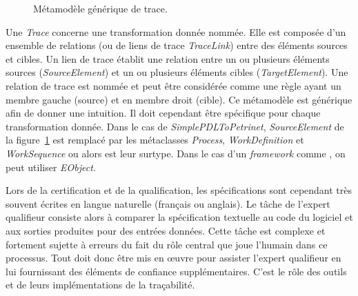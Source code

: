 \begin{figure}[h]
  \begin{center}
    
    \caption{Métamodèle générique de trace.}
    \label{fig:linkmmodel}
  \end{center}
\end{figure}

Une \emph{Trace} concerne une transformation donnée nommée. Elle est composée
d'un ensemble de relations (ou de liens de trace \emph{TraceLink}) entre des
éléments sources et cibles. Un lien de trace établit une relation entre un ou
plusieurs éléments sources (\emph{SourceElement}) et un ou plusieurs éléments
cibles (\emph{TargetElement}). Une relation de trace est nommée et peut être
considérée comme une règle ayant un membre gauche (source) et en membre droit
(cible). Ce métamodèle est générique afin de donner une intuition. Il doit
cependant être spécifique pour chaque transformation donnée. Dans le cas de
\emph{SimplePDLToPetrinet}, \emph{SourceElement} de la
figure~\ref{fig:linkmmodel} est remplacé par les métaclasses \emph{Process},
\emph{WorkDefinition} et \emph{WorkSequence} ou alors est leur surtype. Dans le
cas d'un \emph{framework} comme {\emf}, on peut utiliser \emph{EObject}.

Lors de la certification et de la qualification, les spécifications sont
cependant très souvent écrites en langue naturelle (français ou anglais). Le
tâche de l'expert qualifieur consiste alors à comparer la spécification
textuelle au code du logiciel et aux sorties produites pour des entrées
données. Cette tâche est complexe et fortement sujette à erreurs du fait du
rôle central que joue l'humain dans ce processus. Tout doit donc être mis en
œuvre pour assister l'expert qualifieur en lui fournissant des éléments de
confiance supplémentaires. C'est le rôle des outils et de leurs implémentations
de la traçabilité.


